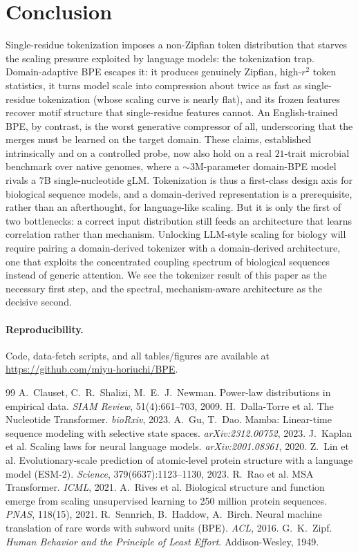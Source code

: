 \documentclass[11pt]{article}
\begin{document}
\section{Conclusion}
Single-residue tokenization imposes a non-Zipfian token distribution that
starves the scaling pressure exploited by language models: the tokenization
trap. Domain-adaptive BPE escapes it: it produces genuinely Zipfian, high-$r^2$
token statistics, it turns model scale into compression about twice as fast as
single-residue tokenization (whose scaling curve is nearly flat), and its frozen
features recover motif structure that single-residue features cannot. An
English-trained BPE, by contrast, is the worst generative compressor of all,
underscoring that the merges must be learned on the target domain. These claims,
established intrinsically and on a controlled probe, now also hold on a real
$21$-trait microbial benchmark over native genomes, where a ${\sim}3$M-parameter
domain-BPE model rivals a $7$B single-nucleotide gLM. Tokenization is thus a
first-class design axis for biological sequence models, and a domain-derived
representation is a prerequisite, rather than an afterthought, for language-like
scaling. But it is only the first of two bottlenecks: a correct input
distribution still feeds an architecture that learns correlation rather than
mechanism. Unlocking LLM-style scaling for biology will require pairing a
domain-derived tokenizer with a domain-derived architecture, one that exploits
the concentrated coupling spectrum of biological sequences instead of generic
attention. We see the tokenizer result of this paper as the necessary first
step, and the spectral, mechanism-aware architecture as the decisive second.

\paragraph{Reproducibility.} Code, data-fetch scripts, and all tables/figures
are available at \url{https://github.com/miyu-horiuchi/BPE}.

\begin{thebibliography}{99}
\small
{} A.\ Clauset, C.\ R.\ Shalizi, M.\ E.\ J.\ Newman. Power-law
distributions in empirical data. \emph{SIAM Review}, 51(4):661--703, 2009.
 H.\ Dalla-Torre et al. The Nucleotide Transformer.
\emph{bioRxiv}, 2023.
 A.\ Gu, T.\ Dao. Mamba: Linear-time sequence modeling with
selective state spaces. \emph{arXiv:2312.00752}, 2023.
 J.\ Kaplan et al. Scaling laws for neural language models.
\emph{arXiv:2001.08361}, 2020.
 Z.\ Lin et al. Evolutionary-scale prediction of atomic-level
protein structure with a language model (ESM-2). \emph{Science},
379(6637):1123--1130, 2023.
 R.\ Rao et al. MSA Transformer. \emph{ICML}, 2021.
 A.\ Rives et al. Biological structure and function emerge from
scaling unsupervised learning to 250 million protein sequences. \emph{PNAS},
118(15), 2021.
 R.\ Sennrich, B.\ Haddow, A.\ Birch. Neural machine translation of
rare words with subword units (BPE). \emph{ACL}, 2016.
 G.\ K.\ Zipf. \emph{Human Behavior and the Principle of Least
Effort}. Addison-Wesley, 1949.
\end{thebibliography}
\end{document}

